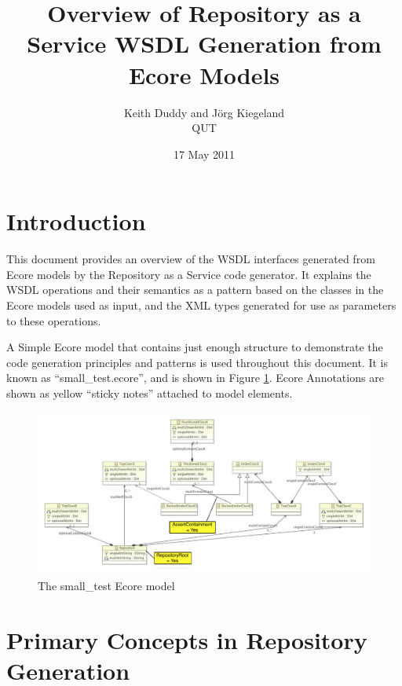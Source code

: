 \documentclass[11pt]{article}
\title{Overview of Repository as a Service WSDL Generation from Ecore Models}
\author{Keith Duddy and J\"org Kiegeland\\QUT} %
\date{17 May 2011}                                           %
\begin{document}
\maketitle
\section{Introduction}
This document provides an overview of the WSDL interfaces generated from Ecore models by the Repository as a Service code generator. It explains the WSDL operations and their semantics as a pattern based on the classes in the Ecore models used as input, and the XML types generated for use as parameters to these operations.

A Simple Ecore model that contains just enough structure to demonstrate the code generation principles and patterns is used throughout this document. It is known as ``small\_test.ecore'', and is shown in Figure \ref{small-test}. Ecore Annotations are shown as yellow ``sticky notes'' attached to model elements.

\begin{figure}[htbp]
\begin{center}
\includegraphics[width=15cm]{SmallTestEcoreWithAnnotations.pdf}
\caption{The small\_test Ecore model}
\label{small-test}
\end{center}
\end{figure}

\section{Primary Concepts in Repository Generation} \label{primary-concepts}
\end{document}
